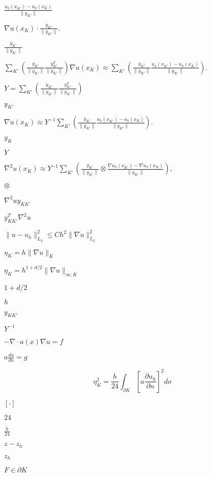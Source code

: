 \documentclass{article}
\begin{document}
$ \frac{u_h(x_{K'}) - u_h(x_K)}{ \|y_{K'}\| }$
\pagebreak

$ \nabla u(x_K) \cdot \frac{y_{K'}}{ \|y_{K'}\| }.$
\pagebreak

$\frac{y_{K'}}{ \|y_{K'}\| }$
\pagebreak

$ \sum_{K'} \left( \frac{y_{K'}}{ \|y_{K'}\|} \frac{y_{K'}^T}{ \|y_{K'}\| } \right) \nabla u(x_K) \approx \sum_{K'} \left( \frac{y_{K'}}{ \|y_{K'}\|} \frac{u_h(x_{K'}) - u_h(x_K)}{ \|y_{K'}\| } \right).$
\pagebreak

$ Y = \sum_{K'} \left( \frac{y_{K'}}{\|y_{K'}\|} \frac{y_{K'}^T}{ \|y_{K'}\| } \right)$
\pagebreak

$y_{K'}$
\pagebreak

$ \nabla u(x_K) \approx Y^{-1} \sum_{K'} \left( \frac{y_{K'}}{\|y_{K'}\|} \frac{u_h(x_{K'}) - u_h(x_K)}{ \|y_{K'}\| } \right).$
\pagebreak

$y_K$
\pagebreak

$Y$
\pagebreak

$ \nabla^2 u(x_K) \approx Y^{-1} \sum_{K'} \left( \frac{y_{K'}}{\|y_{K'}\|} \otimes \frac{\nabla u_h(x_{K'}) - \nabla u_h(x_K)}{ \|y_{K'}\| } \right), $
\pagebreak

$\otimes$
\pagebreak

$\nabla^2 u y_{KK'}$
\pagebreak

$y_{KK'}^T \nabla^2 u$
\pagebreak

$\|u-u_h\|^2_{L_2} \le C h^2 \|\nabla u\|^2_{L_2}$
\pagebreak

$\eta_K = h \|\nabla u\|_K$
\pagebreak

$\eta_K = h^{1+d/2} \|\nabla u\|_{\infty;K}$
\pagebreak

$1+d/2$
\pagebreak

$h$
\pagebreak

$y_{KK'}$
\pagebreak

$Y^{-1}$
\pagebreak

$-\nabla\cdot a(x) \nabla u = f$
\pagebreak

$a\frac{du}{dn} = g$
\pagebreak

\[ \eta_K^2 = \frac h{24} \int_{\partial K} \left[a \frac{\partial u_h}{\partial n}\right]^2 do \]
\pagebreak

$[\cdot]$
\pagebreak

$24$
\pagebreak

$\frac h{24}$
\pagebreak

$z-z_h$
\pagebreak

$z_h$
\pagebreak

$F\in\partial K$
\pagebreak
\end{document}
